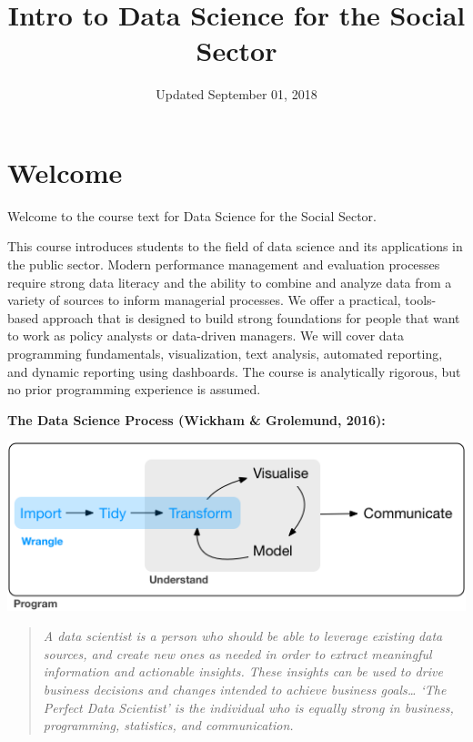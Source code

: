 \documentclass[]{book}
\title{Intro to Data Science for the Social Sector}
\author{}
\date{Updated September 01, 2018}
\theoremstyle{definition}
\theoremstyle{definition}
\theoremstyle{definition}
\theoremstyle{remark}
\begin{document}
\maketitle

{
\setcounter{tocdepth}{1}
\tableofcontents
}
\hypertarget{welcome}{%
\chapter*{Welcome}\label{welcome}}

Welcome to the course text for Data Science for the Social Sector.

This course introduces students to the field of data science and its
applications in the public sector. Modern performance management and
evaluation processes require strong data literacy and the ability to
combine and analyze data from a variety of sources to inform managerial
processes. We offer a practical, tools-based approach that is designed
to build strong foundations for people that want to work as policy
analysts or data-driven managers. We will cover data programming
fundamentals, visualization, text analysis, automated reporting, and
dynamic reporting using dashboards. The course is analytically rigorous,
but no prior programming experience is assumed.

\textbf{The Data Science Process (Wickham \& Grolemund, 2016):}

\includegraphics{figures/data-science-wrangle.png}

\begin{quote}
\emph{A data scientist is a person who should be able to leverage
existing data sources, and create new ones as needed in order to extract
meaningful information and actionable insights. These insights can be
used to drive business decisions and changes intended to achieve
business goals\ldots{} `The Perfect Data Scientist' is the individual
who is equally strong in business, programming, statistics, and
communication.}
\end{quote}
\end{document}
